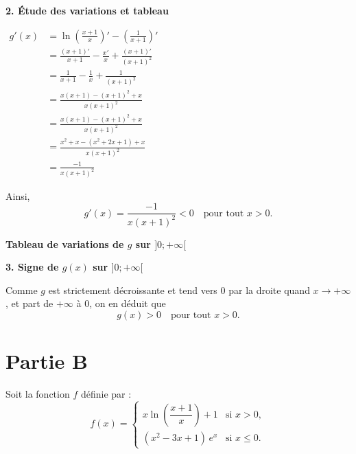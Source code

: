 \documentclass[12pt,a4paper]{article}
\begin{document}
\bigskip

\textbf{2. Étude des variations et tableau}

\(
\begin{aligned}
    g'(x) & = \ln\left( \frac{x+1}{x} \right)' - \left(\frac{1}{x+1}\right)' \\
          & = \frac{(x+1)'}{x+1} - \frac{x'}{x} + \frac{(x+1)'}{(x+1)^2}     \\
          & = \frac{1}{x+1} - \frac{1}{x} + \frac{1}{(x+1)^2}                \\
          & = \frac{x(x+1) - (x+1)^2 + x}{x(x+1)^2}                          \\
          & = \frac{x(x+1) - (x+1)^2 + x}{x(x+1)^2}                          \\
          & = \frac{x^2 + x - (x^2 + 2x + 1) + x}{x(x+1)^2}                  \\
          & = \frac{-1}{x(x+1)^2}
\end{aligned}
\)

Ainsi,
\[
    g'(x) = \frac{-1}{x(x+1)^2} < 0 \quad \text{pour tout } x > 0.
\]

\bigskip

\textbf{Tableau de variations de \( g \) sur \( ]0; +\infty[ \)}


\bigskip

\textbf{3. Signe de \( g(x) \) sur \( ]0; +\infty[ \)}

Comme \( g \) est strictement décroissante et tend vers 0 par la droite quand \( x \to +\infty \), et part de \( +\infty \) à 0, on en déduit que
\[
    g(x) > 0 \quad \text{pour tout } x > 0.
\]

\section*{Partie B}

Soit la fonction \( f \) définie par :
\[
    f(x) =
    \begin{cases}
        x \ln\left( \dfrac{x+1}{x} \right) + 1 & \text{si } x > 0,    \\[6pt]
        (x^2 - 3x + 1)\, e^x                   & \text{si } x \leq 0.
    \end{cases}
\]
\end{document}
